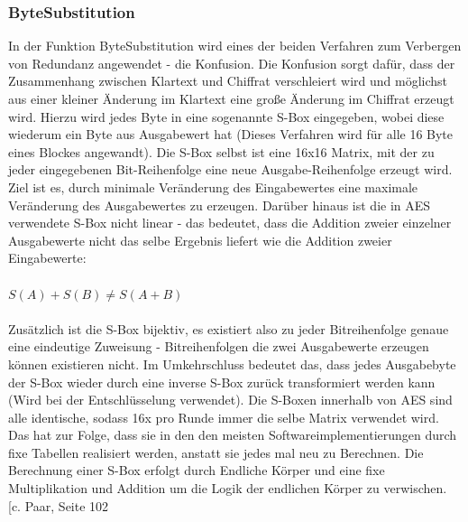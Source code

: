 \documentclass[10pt, a4paper]{scrreprt}
\begin{document}
\subsubsection{ByteSubstitution}
In der Funktion ByteSubstitution wird eines der beiden Verfahren zum Verbergen von Redundanz angewendet - die Konfusion. Die Konfusion sorgt dafür, dass der Zusammenhang zwischen Klartext und Chiffrat verschleiert wird und möglichst aus einer kleiner Änderung im Klartext eine große Änderung im Chiffrat erzeugt wird. Hierzu wird jedes Byte in eine sogenannte S-Box eingegeben, wobei diese  wiederum ein Byte aus Ausgabewert hat (Dieses Verfahren wird für alle 16 Byte eines Blockes angewandt). Die S-Box selbst ist eine 16x16 Matrix, mit der zu jeder eingegebenen Bit-Reihenfolge eine neue Ausgabe-Reihenfolge erzeugt wird. Ziel ist es, durch minimale Veränderung des Eingabewertes eine maximale Veränderung des Ausgabewertes zu erzeugen. Darüber hinaus ist die in AES verwendete S-Box nicht linear - das bedeutet, dass die Addition zweier einzelner Ausgabewerte nicht das selbe Ergebnis liefert wie die Addition zweier Eingabewerte:\\ \\
\(S(A) + S(B) \neq S(A+B)\) \\ \\
Zusätzlich ist die S-Box bijektiv, es existiert also zu jeder Bitreihenfolge genaue eine eindeutige Zuweisung - Bitreihenfolgen die zwei Ausgabewerte erzeugen können existieren nicht. Im Umkehrschluss bedeutet das, dass jedes Ausgabebyte der S-Box wieder durch eine inverse S-Box zurück transformiert werden kann (Wird bei der Entschlüsselung verwendet). Die S-Boxen innerhalb von AES sind alle identische, sodass 16x pro Runde immer die selbe Matrix verwendet wird. Das hat zur Folge, dass sie in den den meisten Softwareimplementierungen durch fixe Tabellen realisiert werden, anstatt sie jedes mal neu zu Berechnen. Die Berechnung einer S-Box erfolgt durch Endliche Körper und eine fixe Multiplikation und Addition um die Logik der endlichen Körper zu verwischen. [c. Paar, Seite 102 %
\end{document}
